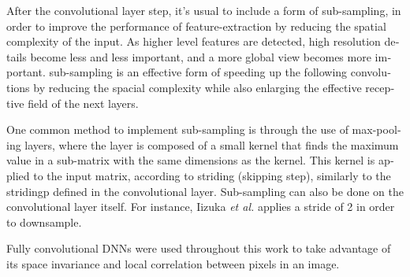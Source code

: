 \documentclass[12pt,openright,oneside,a4paper,english]{abntex2}
\begin{document}
\begin{otherlanguage}{english}
After the convolutional layer step, it's usual to include a form of sub-sampling, in order to improve the performance of feature-extraction by reducing the spatial complexity of the input. As higher level features are detected, high resolution details become less and less important, and a more global view becomes more important. sub-sampling is an effective form of speeding up the following convolutions by reducing the spacial complexity while also enlarging the effective receptive field of the next layers.

One common method to implement sub-sampling is through the use of max-pooling layers,
where the layer is composed of a small kernel that finds the maximum value in a sub-matrix with the same dimensions as the kernel. This kernel is applied to the input matrix, according to striding (skipping step), similarly to the stridingp defined in the convolutional layer. Sub-sampling can also be done on the convolutional layer itself. For instance, Iizuka \textit{et al.} \cite{Iizuka2016} applies a stride of 2 in order to downsample.


Fully convolutional DNNs were used throughout this work to take advantage of its space invariance and local correlation between pixels in an image.


\end{otherlanguage}
\end{document}
